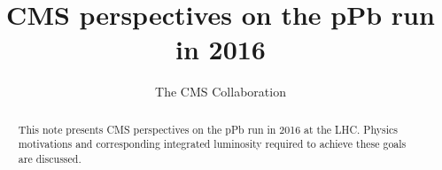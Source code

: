 \documentclass[12pt]{article}
\title{CMS perspectives on the pPb run in 2016}
\author
{ The CMS Collaboration }
\date{}
\begin{document}
 


\baselineskip24pt


\maketitle 


\begin{abstract}

This note presents CMS perspectives on the pPb run in 2016 at the LHC. 
Physics motivations and corresponding integrated luminosity required to achieve
these goals are discussed.


\end{abstract}














\clearpage
\end{document}
